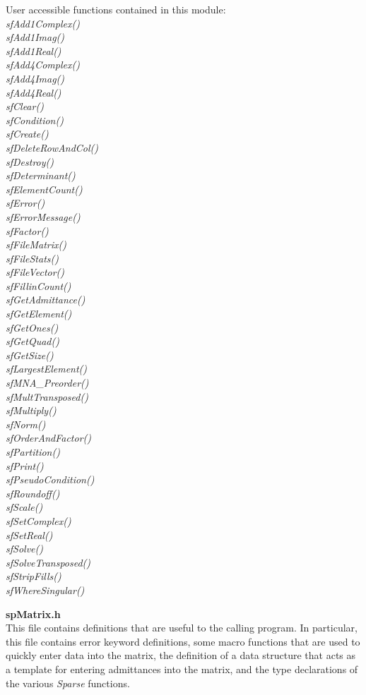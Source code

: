 \documentclass[11pt]{article}
\begin{document}
User accessible functions contained in this module:\emph{\\
sfAdd1Complex()\\
sfAdd1Imag()\\
sfAdd1Real()\\
sfAdd4Complex()\\
sfAdd4Imag()\\
sfAdd4Real()\\
sfClear()\\
sfCondition()\\
sfCreate()\\
sfDeleteRowAndCol()\\
sfDestroy()\\
sfDeterminant()\\
sfElementCount()\\
sfError()\\
sfErrorMessage()\\
sfFactor()\\
sfFileMatrix()\\
sfFileStats()\\
sfFileVector()\\
sfFillinCount()\\
sfGetAdmittance()\\
sfGetElement()\\
sfGetOnes()\\
sfGetQuad()\\
sfGetSize()\\
sfLargestElement()\\
sfMNA\_Preorder()\\
sfMultTransposed()\\
sfMultiply()\\
sfNorm()\\
sfOrderAndFactor()\\
sfPartition()\\
sfPrint()\\
sfPseudoCondition()\\
sfRoundoff()\\
sfScale()\\
sfSetComplex()\\
sfSetReal()\\
sfSolve()\\
sfSolveTransposed()\\
sfStripFills()\\
sfWhereSingular()
}

{\bf spMatrix.h}\\
This file contains definitions that are useful to the calling program.
In particular, this file contains error keyword definitions, some macro
functions that are used to quickly enter data into the matrix, the
definition of a data structure that acts as a template for entering
admittances into the matrix, and the type declarations of the various
\emph{Sparse} functions.
\end{document}
